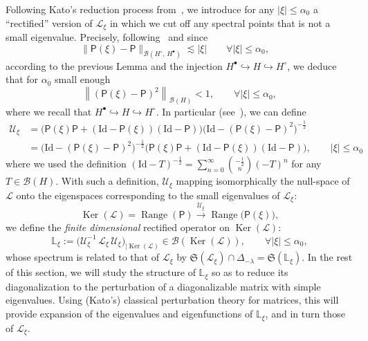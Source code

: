 \documentclass[AHL,Unicode,longabstracts,published]{cedram}
\DeclareMathOperator{\range}{Range}
\DeclareMathOperator{\nul}{Ker}
\newcommand{\Id}{\mathrm{Id}}
\newcommand{\rectL}{\mathbb{L}}
\newcommand{\fkS}{\mathfrak{S}}
\newcommand{\LL}{\mathcal{L}}
\newcommand{\PP}{\mathsf{P}}
\newcommand{\UU}{\mathcal{U}}
\newcommand{\BBB}{\mathscr{B}}
\newcommand{\Ss}{H}
\newcommand{\Ssp}{H^{\bullet}}
\newcommand{\Ssm}{H^{\circ}}
\renewcommand*\le{\leqslant}
\let\oldforall\forall
\renewcommand*{\forall}{\mathrel{\oldforall}}
\begin{document}
Following Kato's reduction process from~\cite[Section~I-4.6, pp.~32--34]{K1995}, we introduce for any $| \xi | \le \alpha_0$ a ``rectified'' version of $\LL_\xi$ in which we cut off any spectral points that is not a small eigenvalue. Precisely, following~\cite[Section~I-4.6]{K1995} and since
\[
\|\PP(\xi)-\PP\|_{\BBB(\Ssm,\,\Ssp)} \lesssim |\xi| \qquad \forall | \xi | \le \alpha_0, \quad
\]
according to the previous Lemma and the injection $\Ssp \hookrightarrow \Ss \hookrightarrow \Ssm$, we deduce that for $\alpha_0$ small enough
\[
\left\|\left(\PP(\xi)-\PP\right)^{2}\right\|_{\BBB(\Ss)} < 1, \qquad \forall | \xi | \le \alpha_0,
\]
where we recall that $\Ssp \hookrightarrow \Ss\hookrightarrow \Ssm.$ In particular (see~\cite[Eqs.~(4.36)--(4.39), p.~33]{K1995}), we can define
\begin{align*}
\UU_\xi &= \Big(\PP(\xi) \PP + (\Id - \PP(\xi))(\Id - \PP) \Big) \Big(\Id -(\PP(\xi) - \PP)^2 \Big)^{-\frac{1}{2}} \\
&= \Big(\Id -(\PP(\xi) - \PP)^2 \Big)^{-\frac{1}{2}} \Big(\PP(\xi) \PP + (\Id - \PP(\xi))(\Id - \PP) \Big), \qquad |\xi| \le \alpha_0
\end{align*}
where we used the definition $(\Id - T)^{-\frac{1}{2}} = \sum_{n= 0}^\infty \binom{-\frac{1}{2}}{n} (-T)^n$ for any $T \in \BBB(\Ss)$. With such a definition, $\UU_{\xi}$ mapping isomorphically the null-space of $\LL$ onto the eigenspaces corresponding to the small eigenvalues of $\LL_\xi$:
\begin{equation*}
\nul(\LL) = \range(\PP) \xrightarrow{\UU_{\xi}} \range\big(\PP(\xi) \big),
\end{equation*}
we define the \emph{finite dimensional} rectified operator on $\nul(\LL)$:
\begin{equation*}
\quad \rectL_{\xi} := \Big(\UU_{\xi}^{-1} \, \LL_{\xi} \, \UU_{\xi} \Big)_{| \nul(\LL) } \in \BBB\left(\nul(\LL) \right), \qquad \forall | \xi | \le \alpha_0, \quad
\end{equation*}
whose spectrum is related to that of $\LL_{\xi}$ by $\fkS(\LL_{\xi}) \cap \Delta_{-\lambda} = \fkS(\rectL_{\xi}).$ In the rest of this section, we will study the structure of $\rectL_{ \xi}$ so as to reduce its diagonalization to the perturbation of a diagonalizable matrix with simple eigenvalues. Using (Kato's) classical perturbation theory for matrices, this will provide expansion of the eigenvalues and eigenfunctions of $\rectL_\xi$, and in turn those of $\LL_{\xi}$.
\end{document}
